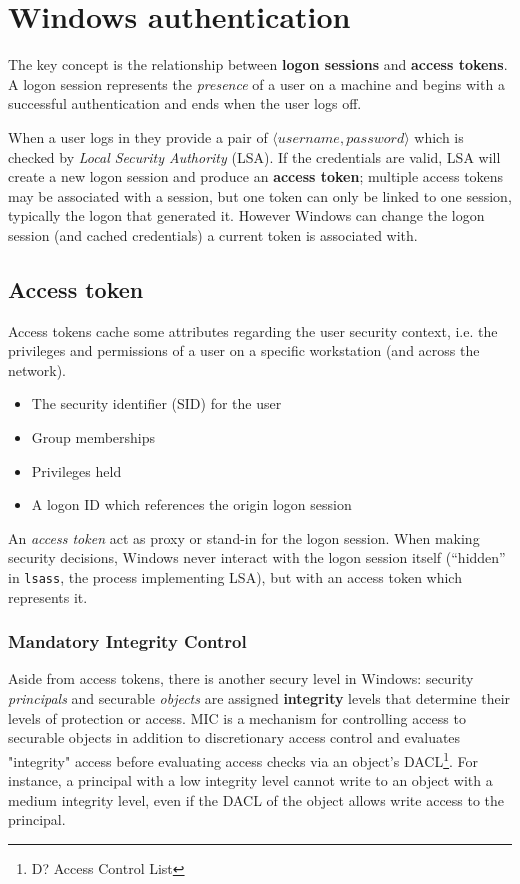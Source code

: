 \chapter{Windows authentication}

The key concept is the relationship between \textbf{logon sessions} and \textbf{access tokens}.
A logon session represents the \textit{presence} of a user on a machine and begins with a successful authentication and ends when the user logs off.

When a user logs in they provide a pair of $\langle username, password \rangle$ which is checked by \textit{Local Security Authority} (LSA).
If the credentials are valid, 
LSA will create a new logon session and produce an
\textbf{access token};
multiple access tokens may be associated with a session, but one
token can only be linked to one session, typically the logon that generated it.
However Windows can change the logon session (and cached credentials) a current token is associated with.

\section{Access token}
Access tokens cache some attributes regarding the user security context, i.e. the privileges and permissions of a user on a specific workstation (and across the network).
\begin{itemize}
   \item The security identifier (SID) for the user
   \item Group memberships
   \item Privileges held
   \item A logon ID which references the origin logon session
\end{itemize}

An \textit{access token} act as proxy or stand-in for the logon session. When making security
decisions, Windows never interact with the logon session itself (“hidden” in \texttt{lsass},
the process implementing LSA), but with an access token which represents it.

\subsection{Mandatory Integrity Control}
Aside from access tokens, there is another secury level in Windows:
security \textit{principals} and securable \textit{objects} are assigned \textbf{integrity} levels that determine their levels of protection or
access.
MIC is a mechanism for controlling access to securable objects in addition to discretionary access control and evaluates "integrity" access before evaluating access checks via an object's DACL\footnote{D? Access Control List}.
For instance, a principal with a low integrity level cannot write to an object with a medium
integrity level, even if the DACL of the object allows write access to the principal.

